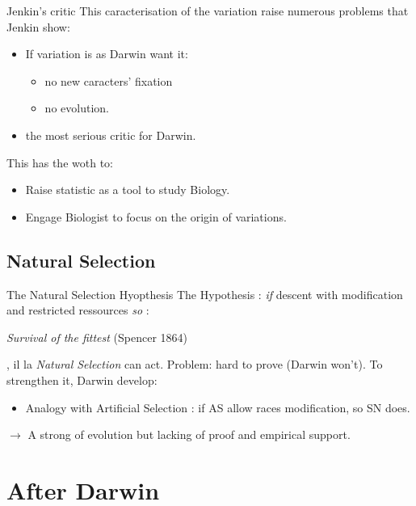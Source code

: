 \documentclass[8pt]{beamer}
\begin{document}
\begin{frame}{Jenkin's critic}
	This caracterisation of the variation raise numerous problems that Jenkin show:
	\begin{beamerboxesrounded}{}
		\begin{itemize}
			\item If variation is as Darwin want it: 
				\begin{itemize}
					\item no new caracters' fixation
					\item no evolution.
				\end{itemize}
			\item the most serious critic for Darwin. 
		\end{itemize}
	\end{beamerboxesrounded}
	\vfill
	This  has the woth to:
	\begin{itemize}
		\item Raise statistic as a tool to study Biology.
		\item Engage Biologist to focus on the origin of variations.
	\end{itemize}

\end{frame}


\subsection{Natural Selection}

\begin{frame}{The Natural Selection Hyopthesis}
	The Hypothesis : \emph{if} descent with modification and restricted ressources \emph{so} :

	\begin{center}
		\emph{Survival of the fittest} (Spencer 1864)
	\end{center}

	, il la \emph{Natural Selection} can act.
	\vfill
	Problem: hard to prove (Darwin won't).
	\vfil
	To strengthen it, Darwin develop:
	\begin{itemize}
		\item Analogy with Artificial Selection : if AS allow races modification, so SN does.
	\end{itemize}

	\vfill


	$\rightarrow$ A strong of evolution but lacking of proof and empirical support.
\end{frame}
\section{After Darwin}
\end{document}
